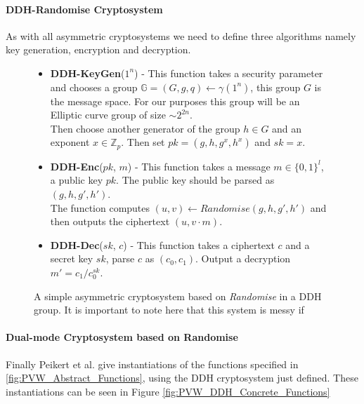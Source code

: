 \documentclass[ %
                    author={Nicholas Tutte},
                supervisor={Prof. Nigel Smart},
                    degree={MEng},
                     title={Secure Two Party Computation},
                  subtitle={A practical comparison of recent protocols},
                      type={Research - GG1K},
                      year={2015} ]{dissertation}
\begin{document}
					\paragraph{DDH-Randomise Cryptosystem} As with all asymmetric cryptosystems we need to define three algorithms namely key generation, encryption and decryption.

					\begin{figure}[!htb]
						\begin{mdframed}
							\centering
							\begin{itemize}
								\item \textbf{DDH-KeyGen}($1^n$) - This function takes a security parameter and chooses a group $\mathbb{G} = (G, g, q) \leftarrow \gamma(1^n)$, this group $G$ is the message space. For our purposes this group will be an Elliptic curve group of size $\sim2^{2n}$.\\[0.25cm]

								Then choose another generator of the group $h \in G$ and an exponent $x \in \mathbb{Z}_p$. Then set $pk = (g, h, g^x, h^x)$ and $sk = x$. 

								\item \textbf{DDH-Enc}($pk$, $m$) - This function takes a message $m \in \{0, 1\}^l$, a public key $pk$. The public key should be parsed as $(g, h, g', h')$.\\[0.25cm]

								The function computes $(u, v) \leftarrow Randomise(g, h, g', h')$ and then outputs the ciphertext $(u, v \cdot m)$.

								\item \textbf{DDH-Dec}($sk$, $c$) - This function takes a ciphertext $c$ and a secret key $sk$, parse $c$ as $(c_0, c_1)$. Output a decryption $m' = c_1 / c_0^{sk}$.

							\end{itemize}
						\end{mdframed}

						\caption{A simple asymmetric cryptosystem based on \emph{Randomise} in a DDH group. It is important to note here that this system is messy if  \label{fig:DDH_Cryptosystem}}
					\end{figure}


					\paragraph{Dual-mode Cryptosystem based on Randomise} Finally Peikert et al. give instantiations of the functions specified in \ref{fig:PVW_Abstract_Functions}, using the DDH cryptosystem just defined. These instantiations can be seen in Figure \ref{fig:PVW_DDH_Concrete_Functions}\\
\end{document}
